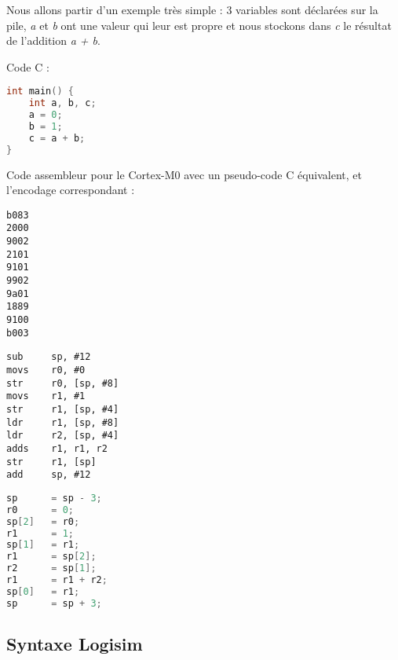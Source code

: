 \documentclass{article}
\begin{document}
    Nous allons partir d'un exemple très simple : 3 variables sont déclarées sur la pile, \textit{a} et \textit{b} ont une valeur qui leur est propre et nous stockons dans \textit{c} le résultat de l'addition \textit{a + b}.
    \newline
    \begin{minipage}{\linewidth}
        Code C :
\begin{lstlisting}[language=C]
int main() {
	int a, b, c;
	a = 0;
	b = 1;
	c = a + b;
}
\end{lstlisting}
    \end{minipage}
    Code assembleur pour le Cortex-M0 avec un pseudo-code C équivalent, et l'encodage correspondant :\\
\begin{minipage}{\linewidth}
\begin{minipage}{1cm}
            \begin{lstlisting}[xleftmargin=0pt]
b083
2000
9002
2101
9101
9902
9a01
1889
9100
b003
            \end{lstlisting}
  \end{minipage}\quad
  \begin{minipage}{.39\textwidth}
            \begin{lstlisting}[language={[ARM]{Assembler}},xleftmargin=0pt]
sub		sp, #12
movs	r0, #0
str		r0, [sp, #8]
movs	r1, #1
str		r1, [sp, #4]
ldr		r1, [sp, #8]
ldr		r2, [sp, #4]
adds	r1, r1, r2
str		r1, [sp]
add		sp, #12
            \end{lstlisting}
  \end{minipage} \quad
  \begin{minipage}{.49\textwidth}
    \begin{lstlisting}[language=C,xleftmargin=0pt]
sp 		= sp - 3;
r0 		= 0;
sp[2] 	= r0;
r1 		= 1;
sp[1] 	= r1;
r1 		= sp[2];
r2 		= sp[1];
r1 		= r1 + r2;
sp[0] 	= r1;
sp 		= sp + 3;
            \end{lstlisting}
  \end{minipage}
\end{minipage}

    \subsection{Syntaxe Logisim}
\end{document}
